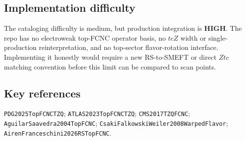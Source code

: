\subsection*{Implementation difficulty}
The cataloging difficulty is medium, but production integration is \textbf{HIGH}.
The repo has no electroweak top-FCNC operator basis, no \(tcZ\) width or
single-production reinterpretation, and no top-sector flavor-rotation interface.
Implementing it honestly would require a new RS-to-SMEFT or direct \(Ztc\)
matching convention before this limit can be compared to scan points.

\subsection*{Key references}
\texttt{PDG2025TopFCNCTZQ}; \texttt{ATLAS2023TopFCNCTZQ};
\texttt{CMS2017TZQFCNC}; \texttt{AguilarSaavedra2004TopFCNC};
\texttt{CsakiFalkowskiWeiler2008WarpedFlavor};
\texttt{AirenFranceschini2026RSTopFCNC}.
